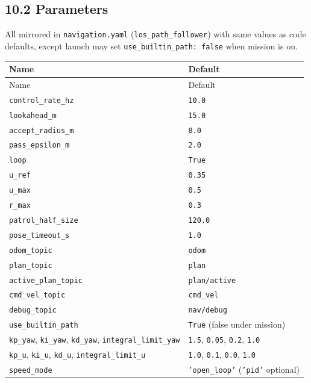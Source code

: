 \subsection{10.2 Parameters}


All mirrored in \texttt{navigation.yaml} (\texttt{los\_path\_follower}) with same values as code defaults, except launch may set \texttt{use\_builtin\_path: false} when mission is on.


\begin{center}
\small
\begin{longtable}{@{}lp{10cm}@{}}
\toprule
Name & Default \\
\midrule
\endfirsthead
\toprule
Name & Default \\
\midrule
\endhead
\texttt{control\_rate\_hz} & \texttt{10.0} \\
\texttt{lookahead\_m} & \texttt{15.0} \\
\texttt{accept\_radius\_m} & \texttt{8.0} \\
\texttt{pass\_epsilon\_m} & \texttt{2.0} \\
\texttt{loop} & \texttt{True} \\
\texttt{u\_ref} & \texttt{0.35} \\
\texttt{u\_max} & \texttt{0.5} \\
\texttt{r\_max} & \texttt{0.3} \\
\texttt{patrol\_half\_size} & \texttt{120.0} \\
\texttt{pose\_timeout\_s} & \texttt{1.0} \\
\texttt{odom\_topic} & \texttt{odom} \\
\texttt{plan\_topic} & \texttt{plan} \\
\texttt{active\_plan\_topic} & \texttt{plan/active} \\
\texttt{cmd\_vel\_topic} & \texttt{cmd\_vel} \\
\texttt{debug\_topic} & \texttt{nav/debug} \\
\texttt{use\_builtin\_path} & \texttt{True} (false under mission) \\
\texttt{kp\_yaw}, \texttt{ki\_yaw}, \texttt{kd\_yaw}, \texttt{integral\_limit\_yaw} & \texttt{1.5}, \texttt{0.05}, \texttt{0.2}, \texttt{1.0} \\
\texttt{kp\_u}, \texttt{ki\_u}, \texttt{kd\_u}, \texttt{integral\_limit\_u} & \texttt{1.0}, \texttt{0.1}, \texttt{0.0}, \texttt{1.0} \\
\texttt{speed\_mode} & \texttt{'open\_loop'} (\texttt{'pid'} optional) \\
\bottomrule
\end{longtable}
\end{center}


